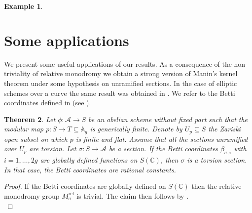 \documentclass[10 pt,a4paper]{article}
\theoremstyle{plain}
\newtheorem{thm}{Theorem}[section]
\theoremstyle{definition}
\newtheorem{expl}[thm]{Example}
\theoremstyle{named}
\newcommand{\cA}{\mathcal A}
\newcommand{\bC}{\mathbb C}
\newcommand{\bZ}{\mathbb Z}
\begin{document}
\begin{expl}
\end{expl}























\section{Some applications}\label{section4}
We present some useful applications of our results. As a consequence of the non-triviality of relative monodromy we obtain a strong version of Manin's kernel theorem under some hypothesis on unramified sections. In the case of elliptic schemes over a curve the same result was obtained in \cite{CZ}. We refer to the Betti coordinates defined in  (see ).

\begin{thm}
    Let $\phi:\cA \to S$ be an abelian scheme without fixed part such that the modular map $p:S \to T \subseteq \mathbb A_g$ is generically finite. Denote by $U_p \subseteq S$ the Zariski open subset on which $p$ is finite and flat. Assume that all the sections unramified over $U_p$ are torsion. Let $\sigma:S \to \cA$ be a section. If the Betti coordinates $\beta_{\sigma,i}$ with $i=1, \ldots, 2g$ are globally defined functions on $S(\bC)$, then $\sigma$ is a torsion section. In that case, the Betti coordinates are rational constants.
\end{thm}

\begin{proof}
    If the Betti coordinates are globally defined on $S(\bC)$ then the relative monodromy group $M_\sigma^{\textrm{rel}}$ is trivial. The claim then follows by .\\
\end{proof}
\end{document}

